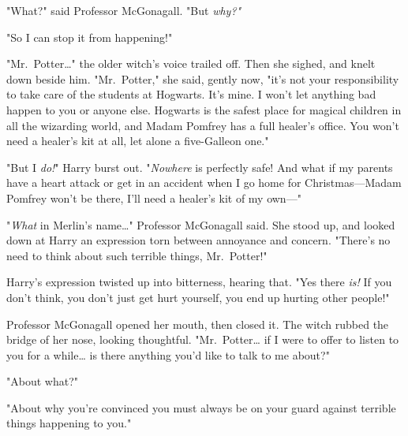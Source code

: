 "What?" said Professor McGonagall. "But \emph{why?"}

"So I can stop it from happening!"

"Mr.~Potter{\ldots}" the older witch's voice trailed off. Then she sighed, and 
knelt down beside him. "Mr.~Potter," she said, gently now, "it's not your 
responsibility to take care of the students at Hogwarts. It's mine. I won't let 
anything bad happen to you or anyone else. Hogwarts is the safest place for 
magical children in all the wizarding world, and Madam Pomfrey has a full 
healer's office. You won't need a healer's kit at all, let alone a five-Galleon 
one."

"But I \emph{do!}" Harry burst out. "\emph{Nowhere} is perfectly safe! And what 
if my parents have a heart attack or get in an accident when I go home for 
Christmas---Madam Pomfrey won't be there, I'll need a healer's kit of my own---"

"\emph{What} in Merlin's name{\ldots}" Professor McGonagall said. She stood up, 
and looked down at Harry an expression torn between annoyance and concern. 
"There's no need to think about such terrible things, Mr.~Potter!"

Harry's expression twisted up into bitterness, hearing that. "Yes there 
\emph{is!} If you don't think, you don't just get hurt yourself, you end up 
hurting other people!"

Professor McGonagall opened her mouth, then closed it. The witch rubbed the 
bridge of her nose, looking thoughtful. "Mr.~Potter{\ldots} if I were to offer 
to listen to you for a while{\ldots} is there anything you'd like to talk to me 
about?"

"About what?"

"About why you're convinced you must always be on your guard against terrible 
things happening to you."

